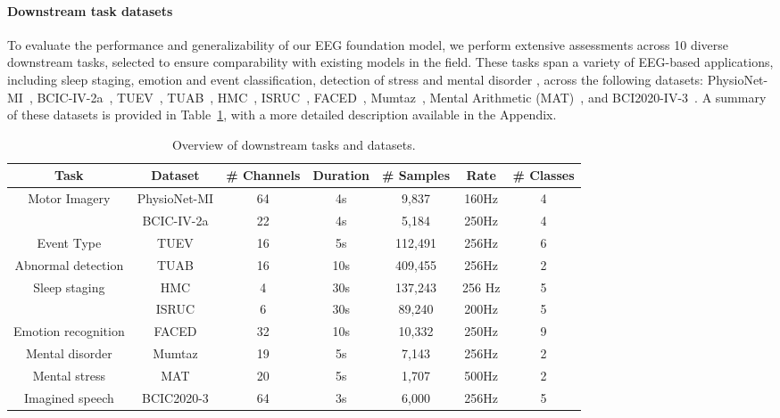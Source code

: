 \documentclass{article}
\begin{document}
\paragraph{Downstream task datasets}
To evaluate the performance and generalizability of our EEG foundation model, we perform extensive assessments across 10 diverse downstream tasks, selected to ensure comparability with existing models in the field. These tasks span a variety of EEG-based applications, including sleep staging, emotion and event classification, detection of stress and mental disorder , across the following datasets: 
PhysioNet-MI~\citep{goldberger2000physiobank}, 
BCIC-IV-2a~\citep{tangermann2012review}, 
TUEV~\citep{obeid2016temple},
TUAB~\citep{obeid2016temple}, 
HMC~\citep{alvarez2021inter}, 
ISRUC~\citep{khalighi2016isruc}, 
FACED~\citep{chen2023large}, 
Mumtaz~\citep{mumtaz2016mdd}, 
Mental Arithmetic (MAT)~\citep{zyma2019electroencephalograms}, 
and BCI2020-IV-3~\citep{jeong20222020}. 
A summary of these datasets is provided in Table~\ref{tab:downstream}, with a more detailed description available in the Appendix.
\begin{table}[h]
\caption{Overview of downstream tasks and datasets.}
\centering
    \small
    \begin{tabular}{ccccccc} 
        \toprule
        \textbf{Task}&\textbf{Dataset}&\textbf{\# Channels}&\textbf{Duration}&\textbf{\# Samples}&\textbf{Rate}&\textbf{\# Classes} \\
        \midrule
        Motor Imagery&PhysioNet-MI&64&4s&9,837&160Hz&4 \\
        &BCIC-IV-2a&22&4s&5,184&250Hz&4 \\
        Event Type&TUEV&16&5s&112,491&256Hz&6 \\
        Abnormal detection&TUAB&16&10s&409,455&256Hz&2 \\
 Sleep staging& HMC& 4& 30s& 137,243&256 Hz&5 \\
 & ISRUC& 6& 30s& 89,240&200Hz&5 \\
Emotion recognition& FACED& 32& 10s& 10,332&250Hz&9 \\
Mental disorder & Mumtaz& 19& 5s& 7,143&256Hz&2 \\
Mental stress& MAT& 20& 5s& 1,707&500Hz&2 \\
Imagined speech& BCIC2020-3& 64& 3s& 6,000 &256Hz&5 \\
    \bottomrule
    \end{tabular}
    \label{tab:downstream}
\end{table}
\end{document}
